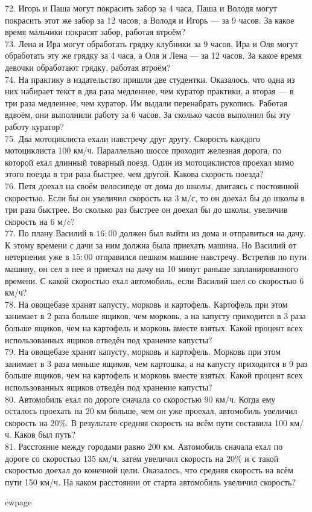 72. Игорь и Паша могут покрасить забор за 4 часа, Паша и Володя могут покрасить этот же забор за 12 часов, а Володя и Игорь --- за 9 часов. За какое время мальчики покрасят забор, работая втроём?\\
73. Лена и Ира могут обработать грядку клубники за 9 часов, Ира и Оля могут обработать эту же грядку за 4 часа, а Оля и Лена --- за 12 часов. За какое время девочки обработают грядку, работая втроём?\\
74. На практику в издательство пришли две студентки. Оказалось, что одна из них набирает текст в два раза медленнее, чем куратор практики, а вторая --- в три раза медленнее, чем куратор. Им выдали перенабрать рукопись. Работая вдвоём, они выполнили работу за 6 часов. За сколько часов выполнил бы эту работу куратор?\\
75. Два мотоциклиста ехали навстречу друг другу. Скорость каждого мотоциклиста 100 км/ч. Параллельно шоссе проходит железная дорога, по которой ехал длинный товарный поезд. Один из мотоциклистов проехал мимо этого поезда в три раза быстрее, чем другой. Какова скорость поезда?\\
76. Петя доехал на своём велосипеде от дома до школы, двигаясь с постоянной скоростью. Если бы он увеличил скорость на 3 м/с, то он доехал бы до школы в три раза быстрее. Во сколько раз быстрее он доехал бы до школы, увеличив скорость на 6 м/c?\\
77. По плану Василий в $16:00$ должен был выйти из дома и отправиться на дачу. К этому времени с дачи за ним должна была приехать машина. Но Василий от нетерпения уже в $15:00$ отправился пешком машине навстречу. Встретив по пути машину, он сел в нее и приехал на дачу на 10 минут раньше запланированного времени. С какой скоростью ехал автомобиль, если Василий шел со скоростью 6 км/ч?\\
78. На овощебазе хранят капусту, морковь и картофель. Картофель при этом занимает в 2 раза больше ящиков, чем морковь, а на капусту приходится в 3 раза больше ящиков, чем на картофель и морковь вместе взятых. Какой процент всех использованных ящиков отведён под хранение капусты?\\
79. На овощебазе хранят капусту, морковь и картофель. Морковь при этом занимает в 3 раза меньше ящиков, чем картошка, а на капусту приходится в 9 раз больше ящиков, чем на картофель и морковь вместе взятых. Какой процент всех использованных ящиков отведён под хранение капусты?\\
80. Автомобиль ехал по дороге сначала со скоростью 90 км/ч. Когда ему осталось проехать на
20 км больше, чем он уже проехал, автомобиль увеличил скорость на $20\%.$ В результате средняя
скорость на всём пути составила 100 км/ч. Каков был путь?\\
81.  Расстояние между городами равно 200 км. Автомобиль сначала ехал по дороге со скоростью
135 км/ч, затем увеличил скорость на $20\%$ и с такой скоростью доехал до конечной цели. Оказалось,
что средняя скорость на всём пути 150 км/ч. На каком расстоянии от старта автомобиль увеличил
скорость?

ewpage
